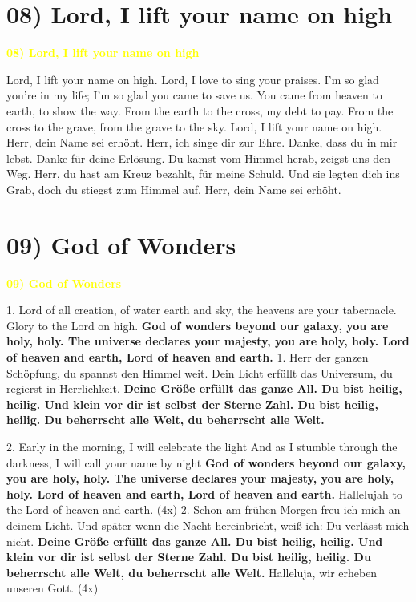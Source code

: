 \documentclass[xcolor=dvipsnames]{beamer}
\newcommand{\songtitle}[1]{\textcolor{yellow}{\textbf{#1}\vspace{0.5em}}}
\newcommand{\z}{\vspace{1em}}
\newcommand{\refr}[1]{\textbf{#1}}
\newcommand{\deutsch}[1]{\textcolor{OliveGreen}{#1}}
\newcommand{\aut}[1]{\flushright{\textcolor{yellow}{\textit{\footnotesize{#1}}\hspace*{1cm}}}}
\newcommand{\songA}[2]{
\section{#1) #2}
\begin{frame1}
\label{#1}\songtitle{#1) #2}}
\begin{document}
\songA{08}{Lord, I lift your name on high}

Lord, I lift your name on high. Lord, I love to sing your praises.
I'm so glad you're in my life; I'm so glad you came to save us.
\z
You came from heaven to earth, to show the way.
From the earth to the cross, my debt to pay.
From the cross to the grave, from the grave to the sky.
Lord, I lift your name on high.
\z
\deutsch{Herr, dein Name sei erhöht. Herr, ich singe dir zur Ehre.
Danke, dass du in mir lebst. Danke für deine Erlösung.
\z
Du kamst vom Himmel herab, zeigst uns den Weg.
Herr, du hast am Kreuz bezahlt, für meine Schuld.
Und sie legten dich ins Grab, doch du stiegst zum Himmel auf.
Herr, dein Name sei erhöht.}

\aut{Rick Founds, 1989}
\end{frame1}

\songA{09}{God of Wonders}

1. Lord of all creation, of water earth and sky,
the heavens are your tabernacle. Glory to the Lord on high.
\z
\refr{God of wonders beyond our galaxy, you are holy, holy.
The universe declares your majesty, you are holy, holy.
Lord of heaven and earth, Lord of heaven and earth.}
\z
\z
\deutsch{1. Herr der ganzen Schöpfung, du spannst den Himmel weit.
Dein Licht erfüllt das Universum, du regierst in Herrlichkeit.
\z
\refr{Deine Größe erfüllt das ganze All. Du bist heilig, heilig.
Und klein vor dir ist selbst der Sterne Zahl. Du bist heilig, heilig.
Du beherrscht alle Welt, du beherrscht alle Welt.}}

\end{frame1}
\begin{frame1}

\z
2. Early in the morning, I will celebrate the light
And as I stumble through the darkness, I will call your name by night
\z
\refr{God of wonders beyond our galaxy, you are holy, holy.
The universe declares your majesty, you are holy, holy.
Lord of heaven and earth, Lord of heaven and earth.}
\z
Hallelujah to the Lord of heaven and earth. (4x)
\z
\deutsch{2. Schon am frühen Morgen freu ich mich an deinem Licht.
Und später wenn die Nacht hereinbricht, weiß ich: Du verlässt mich nicht.
\z
\refr{Deine Größe erfüllt das ganze All. Du bist heilig, heilig.
Und klein vor dir ist selbst der Sterne Zahl. Du bist heilig, heilig.
Du beherrscht alle Welt, du beherrscht alle Welt.}
\z
Halleluja, wir erheben unseren Gott. (4x)}
\vspace{-0.5em}
\aut{Marc Byrd \& Steve Hindalong, 2000}
\end{frame1}
\end{document}
